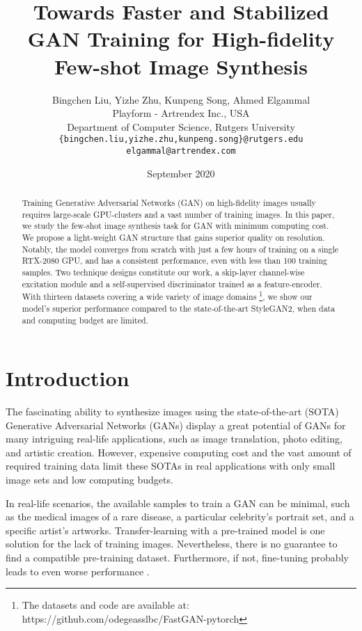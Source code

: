 \documentclass{article} \usepackage{iclr2021_conference,times}
\title{Towards Faster and Stabilized GAN Training for High-fidelity Few-shot Image Synthesis}
\author{Bingchen Liu, Yizhe Zhu, Kunpeng Song, Ahmed Elgammal\\
Playform - Artrendex Inc., USA \\
Department of Computer Science, Rutgers University\\
\texttt{\{bingchen.liu,yizhe.zhu,kunpeng.song\}@rutgers.edu} \\
\texttt{elgammal@artrendex.com}
}
\date{September 2020}
\begin{document}
\maketitle

\begin{abstract}
Training Generative Adversarial Networks (GAN) on high-fidelity images usually requires large-scale GPU-clusters and a vast number of training images. In this paper, we study the few-shot image synthesis task for GAN with minimum computing cost. We propose a light-weight GAN structure that gains superior quality on  resolution. Notably, the model converges from scratch with just a few hours of training on a single RTX-2080 GPU, and has a consistent performance, even with less than 100 training samples. Two technique designs constitute our work, a skip-layer channel-wise excitation module and a self-supervised discriminator trained as a feature-encoder. With thirteen datasets covering a wide variety of image domains \footnote{The datasets and code are available at: https://github.com/odegeasslbc/FastGAN-pytorch}, we show our model's superior performance compared to the state-of-the-art StyleGAN2, when data and computing budget are limited.
\end{abstract}


\section{Introduction}

The fascinating ability to synthesize images using the state-of-the-art (SOTA) Generative Adversarial Networks (GANs) \citep{goodfellow2014generative} display a great potential of GANs for many intriguing real-life applications, such as image translation, photo editing, and artistic creation. However, expensive computing cost and the vast amount of required training data limit these SOTAs in real applications with only small image sets and low computing budgets.

In real-life scenarios, the available samples to train a GAN can be minimal, such as the medical images of a rare disease, a particular celebrity's portrait set, and a specific artist's artworks. Transfer-learning with a pre-trained model \citep{mo2020freeze,wang2020minegan} is one solution for the lack of training images. Nevertheless, there is no guarantee to find a compatible pre-training dataset. Furthermore, if not, fine-tuning probably leads to even worse performance \citep{zhao2020differentiable}. 
\end{document}
